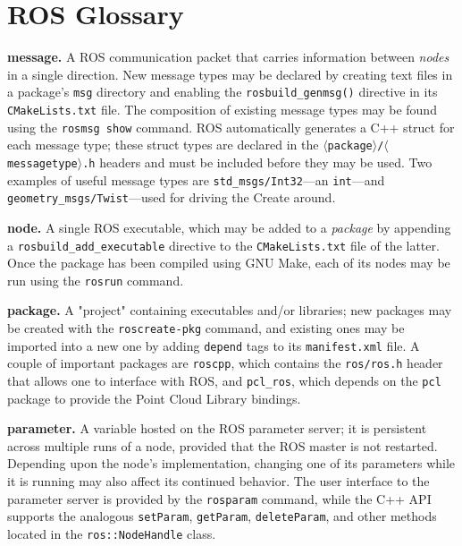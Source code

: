 \documentclass[12pt]{report}
\begin{document}
\section{ROS Glossary}
\begin{itemize}
\begin{sloppypar}
\item{\textbf{message.} A ROS communication packet that carries information between \textit{nodes} in a single direction.  New message types may be declared by creating text files in a package's \texttt{msg} directory and enabling the \texttt{rosbuild\_genmsg()} directive in its \texttt{CMakeLists.txt} file.  The composition of existing message types may be found using the \texttt{rosmsg show} command.  ROS automatically generates a C++ struct for each message type; these struct types are declared in the \texttt{$\langle$package$\rangle$/$\langle$messagetype$\rangle$.h} headers and must be included before they may be used.  Two examples of useful message types are \texttt{std\_msgs/Int32}---an \texttt{int}---and \texttt{geometry\_msgs/Twist}---used for driving the Create around.}
\item{\textbf{node.} A single ROS executable, which may be added to a \textit{package} by appending a \texttt{rosbuild\_add\_executable} directive to the \texttt{CMakeLists.txt} file of the latter.  Once the package has been compiled using GNU Make, each of its nodes may be run using the \texttt{rosrun} command.}
\end{sloppypar}
\item{\textbf{package.} A "project" containing executables and/or libraries; new packages may be created with the \texttt{roscreate-pkg} command, and existing ones may be imported into a new one by adding \texttt{depend} tags to its \texttt{manifest.xml} file.  A couple of important packages are \texttt{roscpp}, which contains the \texttt{ros/ros.h} header that allows one to interface with ROS, and \texttt{pcl\_ros}, which depends on the \texttt{pcl} package to provide the Point Cloud Library bindings.}
\item{\textbf{parameter.} A variable hosted on the ROS parameter server; it is persistent across multiple runs of a node, provided that the ROS master is not restarted.  Depending upon the node's implementation, changing one of its parameters while it is running may also affect its continued behavior.  The user interface to the parameter server is provided by the \texttt{rosparam} command, while the C++ API supports the analogous \texttt{setParam}, \texttt{getParam}, \texttt{deleteParam}, and other methods located in the \texttt{ros::NodeHandle} class.}

\end{itemize}
\end{document}
